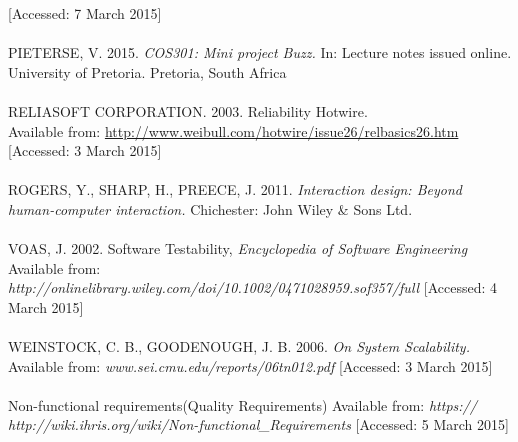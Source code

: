 \documentclass[a4paper]{article}
\begin{document}
[Accessed: 7 March 2015]
\\
\\PIETERSE, V. 2015.\textit{ COS301: Mini project Buzz.} In: Lecture notes issued online. University of Pretoria. Pretoria, South Africa
\\
\\RELIASOFT CORPORATION. 2003. Reliability Hotwire.
\\Available from: \url{http://www.weibull.com/hotwire/issue26/relbasics26.htm}
[Accessed: 3 March 2015]
\\
\\ROGERS, Y., SHARP, H., PREECE, J. 2011.\textit{ Interaction design: Beyond human-computer interaction.} Chichester: John Wiley & Sons Ltd.
\\
\\VOAS, J. 2002. Software Testability,\textit{ Encyclopedia of Software Engineering}
Available from:\textit{ http://onlinelibrary.wiley.com/doi/10.1002/0471028959.sof357/full}
[Accessed: 4 March 2015]
\\
\\WEINSTOCK, C. B., GOODENOUGH, J. B. 2006. \textit{On System Scalability. }
Available from: \textit{www.sei.cmu.edu/reports/06tn012.pdf}
[Accessed: 3 March 2015]
\\
\\Non-functional requirements(Quality Requirements)
Available from:\textit{ https:// http://wiki.ihris.org/wiki/Non-functional_Requirements }
[Accessed: 5 March 2015]
\end{document}
